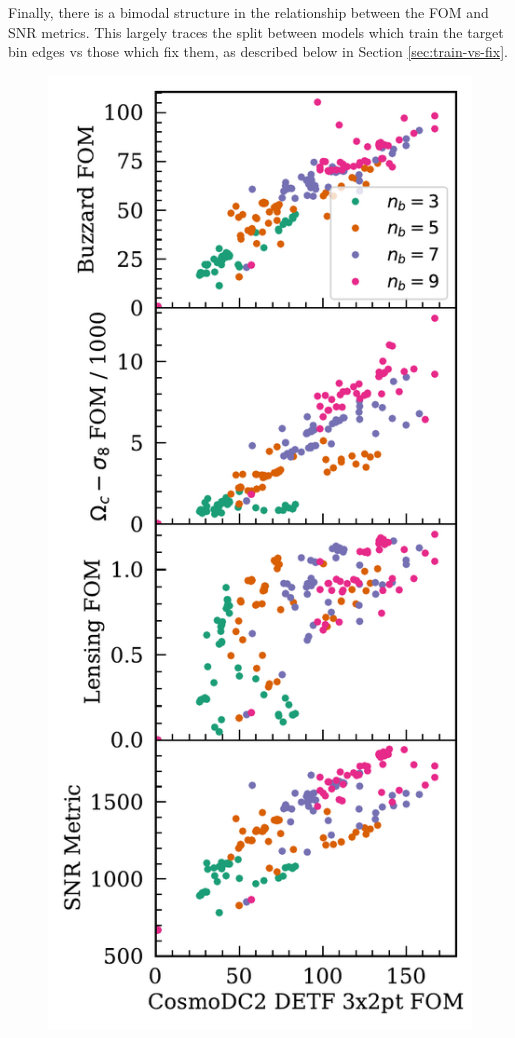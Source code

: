 \documentclass[twocolumn,twocolappendix]{aastex63}
\begin{document}
Finally, there is a bimodal structure in the relationship between the FOM and SNR metrics.
This largely traces the split between models which train the target bin edges vs those
which fix them, as described below in Section \ref{sec:train-vs-fix}.



\begin{figure}[htbp]
\includegraphics[width=0.9\linewidth]{results/metric_comparisons.pdf}

\end{figure}
\end{document}
